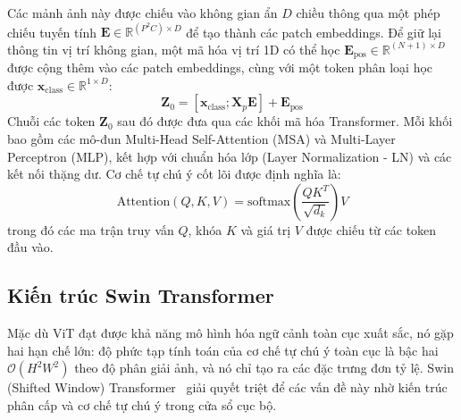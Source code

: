 \documentclass[11pt, a4paper]{article}
\begin{document}
Các mảnh ảnh này được chiếu vào không gian ẩn $D$ chiều thông qua một phép chiếu tuyến tính $\mathbf{E} \in \mathbb{R}^{(P^2 C) \times D}$ để tạo thành các patch embeddings. Để giữ lại thông tin vị trí không gian, một mã hóa vị trí 1D có thể học $\mathbf{E}_{\text{pos}} \in \mathbb{R}^{(N+1) \times D}$ được cộng thêm vào các patch embeddings, cùng với một token phân loại học được $\mathbf{x}_{\text{class}} \in \mathbb{R}^{1 \times D}$:
\begin{equation}\label{eq:vit_embedding}
    \mathbf{Z}_0 = [\mathbf{x}_{\text{class}}; \mathbf{X}_p \mathbf{E}] + \mathbf{E}_{\text{pos}}
\end{equation}
Chuỗi các token $\mathbf{Z}_0$ sau đó được đưa qua các khối mã hóa Transformer. Mỗi khối bao gồm các mô-đun Multi-Head Self-Attention (MSA) và Multi-Layer Perceptron (MLP), kết hợp với chuẩn hóa lớp (Layer Normalization - LN) và các kết nối thặng dư. Cơ chế tự chú ý cốt lõi được định nghĩa là:
\begin{equation}\label{eq:self_attention}
    \text{Attention}(Q, K, V) = \text{softmax}\left(\frac{QK^T}{\sqrt{d_k}}\right)V
\end{equation}
trong đó các ma trận truy vấn $Q$, khóa $K$ và giá trị $V$ được chiếu từ các token đầu vào.

\subsection{Kiến trúc Swin Transformer}

Mặc dù ViT đạt được khả năng mô hình hóa ngữ cảnh toàn cục xuất sắc, nó gặp hai hạn chế lớn: độ phức tạp tính toán của cơ chế tự chú ý toàn cục là bậc hai $\mathcal{O}(H^2 W^2)$ theo độ phân giải ảnh, và nó chỉ tạo ra các đặc trưng đơn tỷ lệ. Swin (Shifted Window) Transformer~\cite{liu2021swin} giải quyết triệt để các vấn đề này nhờ kiến trúc phân cấp và cơ chế tự chú ý trong cửa sổ cục bộ.
\end{document}
